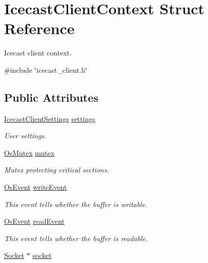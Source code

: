 \hypertarget{structIcecastClientContext}{}\section{Icecast\+Client\+Context Struct Reference}
\label{structIcecastClientContext}


Icecast client context.  




{\ttfamily \#include \char`\"{}icecast\+\_\+client.\+h\char`\"{}}

\subsection*{Public Attributes}
\begin{DoxyCompactItemize}
\item 
\hyperlink{structIcecastClientSettings}{Icecast\+Client\+Settings} \hyperlink{structIcecastClientContext_a7db51aaf2d8cf4dab51f043a38df29bb}{settings}
\begin{DoxyCompactList}\small\item\em User settings. \end{DoxyCompactList}\item 
\hyperlink{structOsMutex}{Os\+Mutex} \hyperlink{structIcecastClientContext_a6010fc4c4397ce78077161827ca96e13}{mutex}
\begin{DoxyCompactList}\small\item\em Mutex protecting critical sections. \end{DoxyCompactList}\item 
\hyperlink{structOsEvent}{Os\+Event} \hyperlink{structIcecastClientContext_a176c1feb7963f60a5dc8044f7d6002c4}{write\+Event}
\begin{DoxyCompactList}\small\item\em This event tells whether the buffer is writable. \end{DoxyCompactList}\item 
\hyperlink{structOsEvent}{Os\+Event} \hyperlink{structIcecastClientContext_aad69417e9a2e8e5cd2b8e9543b2f7f4f}{read\+Event}
\begin{DoxyCompactList}\small\item\em This event tells whether the buffer is readable. \end{DoxyCompactList}\item 
\hyperlink{socket_8h_aa85acfb0fa336ef495e6ba87fb88fc48}{Socket} $\ast$ \hyperlink{structIcecastClientContext_a2369e7cffe879fc3b2111beedcae5ce0}{socket}

\end{DoxyCompactItemize}
